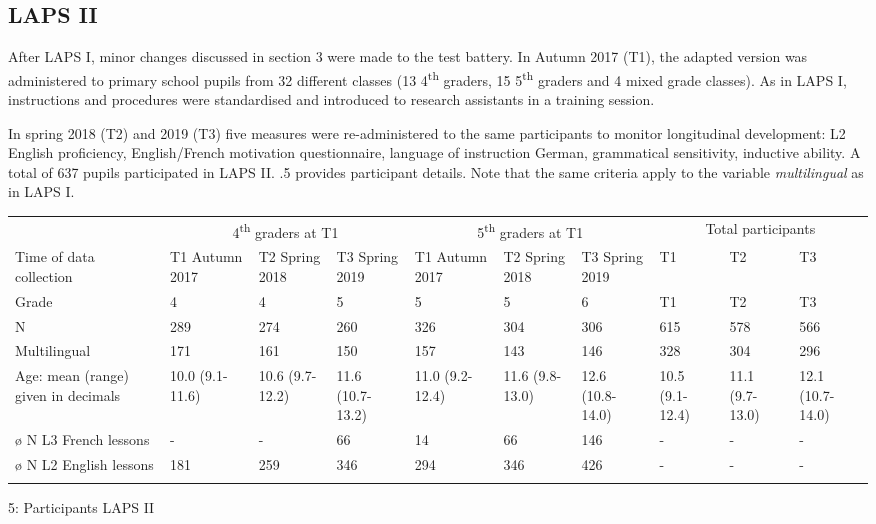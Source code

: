 \documentclass[output=paper]{langsci/langscibook}
\begin{document}
 \subsection{LAPS II}


After LAPS I, minor changes discussed in section 3 were made to the test battery. In Autumn 2017 (T1), the adapted version was administered to primary school pupils from 32 different classes (13 4\textsuperscript{th} graders, 15 5\textsuperscript{th} graders and 4 mixed grade classes). As in LAPS I, instructions and procedures were standardised and introduced to research assistants in a training session. 

In spring 2018 (T2) and 2019 (T3) five measures were re-administered to the same participants to monitor longitudinal development: L2 English proficiency, English/French motivation questionnaire, language of instruction German, grammatical sensitivity, inductive ability. A total of 637 pupils participated in LAPS II. .5 provides participant details. Note that the same criteria apply to the variable \textit{multilingual} as in LAPS I. 


\begin{tabularx}{\textwidth}{XXXXXXXXXX} & \multicolumn{3}{c}{4\textsuperscript{th} graders at T1} & \multicolumn{3}{c}{5\textsuperscript{th} graders at T1} & \multicolumn{3}{c}{Total participants}\\

\lsptoprule
Time of data collection & T1 Autumn 2017 & T2 Spring 2018 & T3 Spring 2019 & T1 Autumn 2017 & T2 Spring 2018 & T3 Spring 2019 & T1 & T2 & T3\\
Grade & 4 & 4 & 5 & 5 & 5 & 6 & T1 & T2 & T3\\
N & 289 & 274 & 260 & 326 & 304 & 306 & 615 & 578 & 566\\
Multilingual & 171 & 161 & 150 & 157 & 143 & 146 & 328 & 304 & 296\\
Age: mean (range) given in decimals & 10.0 (9.1-11.6) & 10.6 (9.7-12.2) & 11.6 (10.7-13.2) & 11.0 (9.2-12.4) & 11.6 (9.8-13.0) & 12.6 (10.8-14.0) & 10.5 (9.1-12.4) & 11.1 (9.7-13.0) & 12.1 (10.7-14.0)\\
ø N L3 French lessons & {}- & {}- & 66 & 14 & 66 & 146 & {}- & {}- & {}-\\
ø N L2 English lessons & 181 & 259 & 346 & 294 & 346 & 426 & {}- & {}- & {}-\\
\lspbottomrule
\end{tabularx}
\begin{table}
\caption{5: Participants LAPS II}
\label{tab:02:2}
\end{table}
\end{document}
